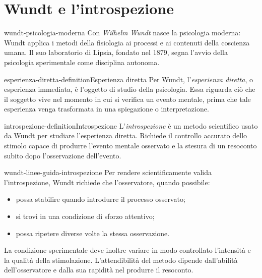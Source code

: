 \documentclass[preview]{standalone}
\begin{document}
\genpage

\section{Wundt e l'introspezione}

\begin{snippet}{wundt-psicologia-moderna}
    Con \emph{Wilhelm Wundt} nasce la psicologia moderna: Wundt applica i
    metodi della fisiologia ai processi e ai contenuti della coscienza umana.
    Il suo laboratorio di Lipsia, fondato nel 1879, segna l'avvio della
    psicologia sperimentale come disciplina autonoma.
\end{snippet}

\begin{snippetdefinition}{esperienza-diretta-definition}{Esperienza diretta}
    Per Wundt, l'\emph{esperienza diretta}, o esperienza immediata, è
    l'oggetto di studio della psicologia. Essa riguarda ciò che il soggetto
    vive nel momento in cui si verifica un evento mentale, prima che tale
    esperienza venga trasformata in una spiegazione o interpretazione.
\end{snippetdefinition}

\begin{snippetdefinition}{introspezione-definition}{Introspezione}
    L'\emph{introspezione} è un metodo scientifico usato da Wundt per studiare
    l'esperienza diretta. Richiede il controllo accurato dello stimolo capace
    di produrre l'evento mentale osservato e la stesura di un resoconto subito
    dopo l'osservazione dell'evento.
\end{snippetdefinition}

\begin{snippet}{wundt-linee-guida-introspezione}
    Per rendere scientificamente valida l'introspezione, Wundt richiede che
    l'osservatore, quando possibile:
    \begin{itemize}
        \item possa stabilire quando introdurre il processo osservato;
        \item si trovi in una condizione di sforzo attentivo;
        \item possa ripetere diverse volte la stessa osservazione.
    \end{itemize}
    La condizione sperimentale deve inoltre variare in modo controllato
    l'intensità e la qualità della stimolazione. L'attendibilità del metodo
    dipende dall'abilità dell'osservatore e dalla sua rapidità nel produrre il
    resoconto.
\end{snippet}
\end{document}
